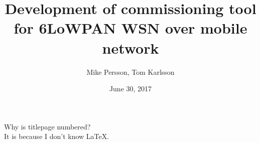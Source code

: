 \documentclass[12pt]{article}
\begin{document}
\begin{titlepage}
	
\title{Development of 		commissioning tool for 6LoWPAN WSN over mobile network}
\author{Mike Persson, Tom Karlsson}
\date{June 30, 2017}
\maketitle

\end{titlepage}

Why is titlepage numbered?\\
It is because I don't know LaTeX.
\end{document}
